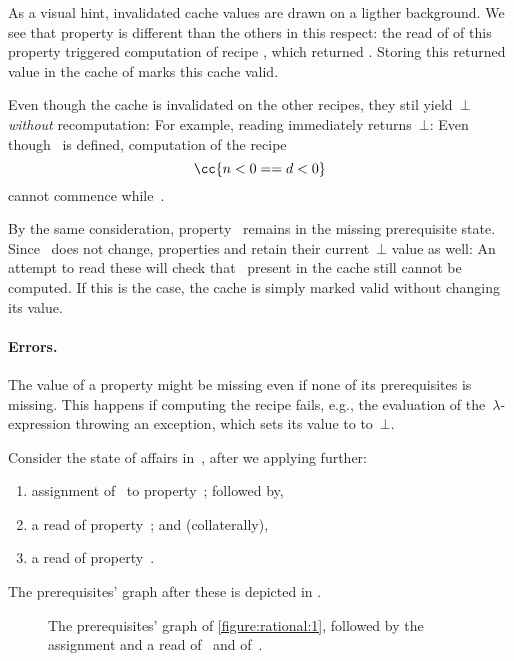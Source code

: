 As a visual hint, invalidated cache values are drawn on a ligther background.
We see that property  is different than the others in this
respect: the read of of this property triggered computation of recipe
, which returned . Storing this returned value in the cache
of  marks this cache valid.

Even though the cache is invalidated on the other recipes, they stil
yield~$⊥$ \emph{without} recomputation: For example, reading
 immediately returns~$⊥$: Even though~ is defined,
computation of the recipe \[
  \cc{n < 0 == d < 0}
\] cannot commence
while~.

By the same consideration, property~ remains in the missing
prerequisite state. Since~ does not change, properties 
and  retain their current~$⊥$ value as well: An attempt to
read these will check that~ present in the cache still cannot
be computed. If this is the case, the cache is simply marked valid
without changing its value.

\paragraph{Errors.}
The value of a property might be missing even if none of its prerequisites is
missing. This happens if computing the recipe fails, e.g., the \Java
evaluation of the~$λ$-expression throwing an exception, which sets its value
to to~$⊥$.

Consider the state of affairs in~, after we applying further:
\begin{enumerate}
  \item assignment of~ to property~; followed by,
  \item a read of property~; and (collaterally),
  \item a read of property~.
\end{enumerate}

The prerequisites' graph after these is depicted in .

\begin{figure}
  \caption{\label{figure:rational:2}%
    The prerequisites' graph of \cref{figure:rational:1},
    followed by the assignment  and a read
    of~ and of~.
  }
  \begin{adjustbox}{max width=\columnwidth}
    
  \end{adjustbox}
\end{figure}

